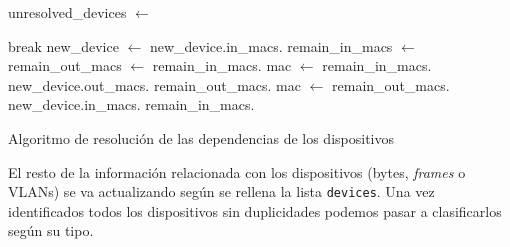 \documentclass[twoside, 12pt]{epstfg}
\begin{document}
\begin{algorithm}[btp]
\begin{algorithmic}
\State unresolved\_devices $\gets$ 

        \State break
    \EndIf
    \State new\_device $\gets$ 
    \State new\_device.in\_macs.
    \State remain\_in\_macs $\gets$ 
    \State remain\_out\_macs $\gets$ 
    \State remain\_in\_macs.
        \State mac $\gets$ remain\_in\_macs.
            \State new\_device.out\_macs.
            \State remain\_out\_macs.
        \EndFor
            \State mac $\gets$ remain\_out\_macs.
                \State new\_device.in\_macs.
                \State remain\_in\_macs.
            \EndFor
        \EndWhile
    \EndWhile
\EndFor

\EndFunction
\end{algorithmic}
\caption{Algoritmo de resolución de las dependencias de los dispositivos}
\label{lst:AlgoritmoResolucionDispositivos}
\end{algorithm}

El resto de la información relacionada con los dispositivos (bytes, \textit{frames} o VLANs) se va actualizando según se rellena la lista \texttt{devices}. Una vez identificados todos los dispositivos sin duplicidades podemos pasar a clasificarlos según su tipo.
\end{document}
